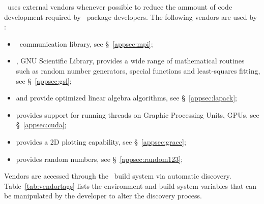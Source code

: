 \draco\ uses external vendors whenever possible to reduce the ammount
of code development required by \draco\ package developers.  The
following vendors are used by \draco:
\begin{itemize}
\item \mpi\ communication library, see \S~\ref{appsec:mpi};
\item {}, GNU Scientific Library, provides a wide range of mathematical routines such as random number generators, special functions and least-squares fitting, see \S~\ref{appsec:gsl};
\item {} and  provide optimized linear algebra algorithms, see \S~\ref{appsec:lapack};
\item {} provides support for running threads on Graphic Processing Units, GPUs, see \S~\ref{appsec:cuda};
\item {} provides a 2D plotting capability, see \S~\ref{appsec:grace};
\item {} provides random numbers, see \S~\ref{appsec:random123};
\end{itemize}
Vendors are accessed through the \draco\ build system via automatic discovery.  
Table~\ref{tab:vendortags} lists the environment and build system variables that can be manipulated by the developer to alter the discovery process.
